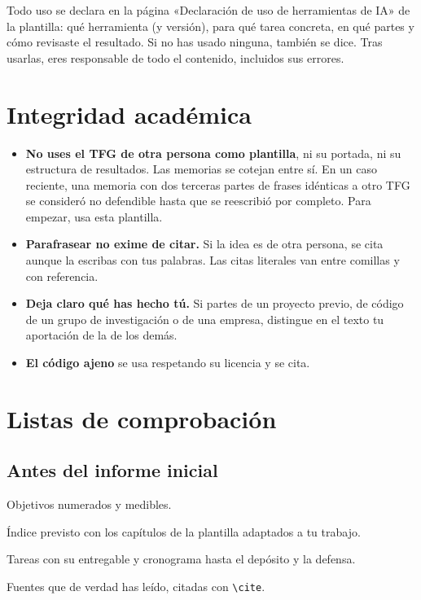 \documentclass[11pt,a4paper]{article}
\newcommand{\cmd}[1]{\texttt{\textbackslash #1}}
\begin{document}
Todo uso se declara en la página «Declaración de uso de herramientas de IA» de
la plantilla: qué herramienta (y versión), para qué tarea concreta, en qué partes
y cómo revisaste el resultado. Si no has usado ninguna, también se dice. Tras
usarlas, eres responsable de todo el contenido, incluidos sus errores.

\section{Integridad académica}
\label{sec:integridad}

\begin{itemize}
  \item \textbf{No uses el TFG de otra persona como plantilla}, ni su portada,
        ni su estructura de resultados. Las memorias se cotejan entre sí. En un
        caso reciente, una memoria con dos terceras partes de frases idénticas
        a otro TFG se consideró no defendible hasta que se reescribió por
        completo. Para empezar, usa esta plantilla.
  \item \textbf{Parafrasear no exime de citar.} Si la idea es de otra persona, se
        cita aunque la escribas con tus palabras. Las citas literales van entre
        comillas y con referencia.
  \item \textbf{Deja claro qué has hecho tú.} Si partes de un proyecto previo, de
        código de un grupo de investigación o de una empresa, distingue en el
        texto tu aportación de la de los demás.
  \item \textbf{El código ajeno} se usa respetando su licencia y se cita.
\end{itemize}

\section{Listas de comprobación}
\label{sec:checklists}

\subsection{Antes del informe inicial}
\begin{checklist}
  \item Objetivos numerados y medibles.
  \item Índice previsto con los capítulos de la plantilla adaptados a tu trabajo.
  \item Tareas con su entregable y cronograma hasta el depósito y la defensa.
  \item Fuentes que de verdad has leído, citadas con \cmd{cite}.
\end{checklist}
\end{document}
